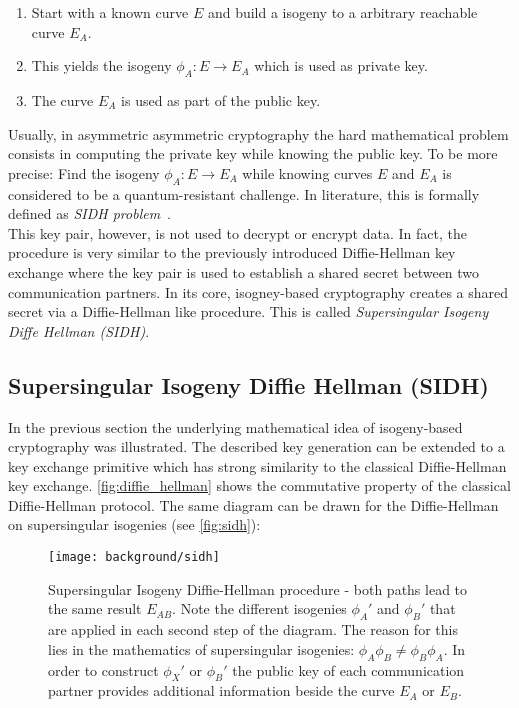 \begin{enumerate}
\item Start with a known curve $E$ and build a isogeny to a arbitrary reachable curve $E_A$.
\item This yields the isogeny $\phi_A: E \to E_A$ which is used as private key.
\item The curve $E_A$ is used as part of the public key.
\end{enumerate}
Usually, in asymmetric asymmetric cryptography the hard mathematical problem consists in computing the private key while knowing the public key. To be more precise: Find the isogeny $\phi_A: E \to E_A$ while knowing curves $E$ and $E_A$ is considered to be a quantum-resistant challenge. In literature, this is formally defined as \textit{\gls{SIDH} problem}~\parencite{sike2020spec}. 
\\
This key pair, however, is not used to decrypt or encrypt data. In fact, the procedure is very similar to the previously introduced Diffie-Hellman key exchange where the key pair is used to establish a shared secret between two communication partners.
In its core, isogney-based cryptography creates a shared secret via a Diffie-Hellman like procedure. This is called \textit{Supersingular Isogeny Diffe Hellman (\gls{SIDH})}.

\subsection{Supersingular Isogeny Diffie Hellman (\gls{SIDH})}

In the previous section the underlying mathematical idea of isogeny-based cryptography was illustrated. The described key generation can be extended to a key exchange primitive which has strong similarity to the classical Diffie-Hellman key exchange.
 \autoref{fig:diffie_hellman} shows the commutative property of the classical Diffie-Hellman protocol. The same diagram can be drawn for the Diffie-Hellman on supersingular isogenies (see \autoref{fig:sidh}):
\begin{figure}[H]
  \centering
  \texttt{[image: background/sidh]}
  \caption[Supersingular Isogeny Diffie-Hellman diagram]{Supersingular Isogeny Diffie-Hellman procedure - both paths lead to the same result $E_{AB}$. Note the different isogenies $\phi_{A}'$ and $\phi_{B}'$ that are applied in each second step of the diagram. The reason for this lies in the mathematics of supersingular isogenies: $\phi_{A} \phi_{B} \neq \phi_{B} \phi_{A}$. In order to construct $\phi_{X}'$ or $\phi_{B}'$ the public key of each communication partner provides additional information beside the curve $E_A$ or $E_B$.~\parencite{costello2016gentle}}
  \label{fig:sidh}
\end{figure}

